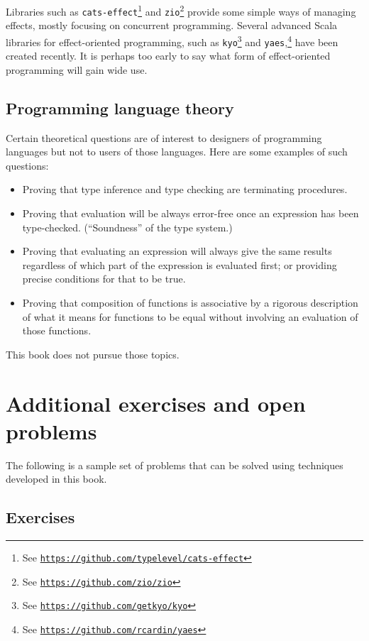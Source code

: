Libraries such as \lstinline!cats-effect!\footnote{See \texttt{\href{https://github.com/typelevel/cats-effect}{https://github.com/typelevel/cats-effect}}}
and \lstinline!zio!\footnote{See \texttt{\href{https://github.com/zio/zio}{https://github.com/zio/zio}}}
provide some simple ways of managing effects, mostly focusing on concurrent
programming. Several advanced Scala libraries for effect-oriented
programming, such as \lstinline!kyo!\footnote{See \texttt{\href{https://github.com/getkyo/kyo}{https://github.com/getkyo/kyo}}}
and \lstinline!yaes!,\footnote{See \texttt{\href{https://github.com/rcardin/yaes}{https://github.com/rcardin/yaes}}}
have been created recently. It is perhaps too early to say what form
of effect-oriented programming will gain wide use.

\subsection{Programming language theory}

Certain theoretical questions are of interest to designers of programming
languages but not to users of those languages. Here are some examples
of such questions:
\begin{itemize}
\item Proving that type inference and type checking are terminating procedures.
\item Proving that evaluation will be always error-free once an expression
has been type-checked. (\textsf{``}Soundness\textsf{''} of the type system.)
\item Proving that evaluating an expression will always give the same results
regardless of which part of the expression is evaluated first; or
providing precise conditions for that to be true.
\item Proving that composition of functions is associative by a rigorous
description of what it means for functions to be equal without involving
an evaluation of those functions.
\end{itemize}
This book does not pursue those topics.

\section{Additional exercises and open problems\label{chap:Exercises-in-AFTT}}

The following is a sample set of problems that can be solved using
techniques developed in this book.

\subsection{Exercises}

